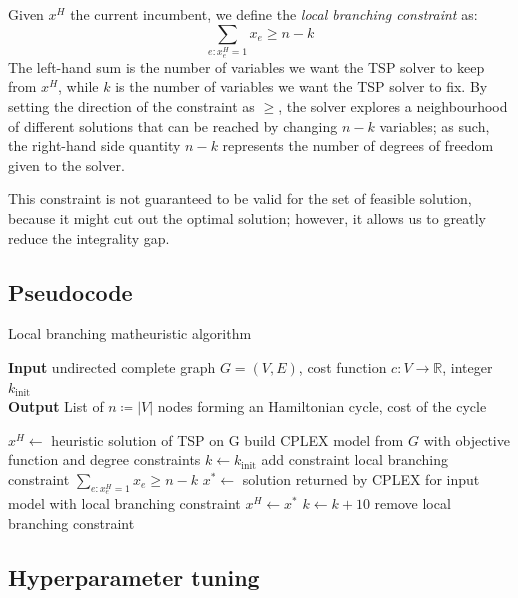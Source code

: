 Given $x^H$ the current incumbent, we define the \textit{local branching constraint} as:
$$\sum_{e:x^H_e=1}x_e\geq n-k$$
The left-hand sum is the number of variables we want the TSP solver to keep from $x^H$, while $k$ is the number of variables we want the TSP solver to fix. By setting the direction of the constraint as $\geq$, the solver explores a neighbourhood of different solutions that can be reached by changing $n-k$ variables; as such, the right-hand side quantity $n-k$ represents the number of degrees of freedom given to the solver.

This constraint is not guaranteed to be valid for the set of feasible solution, because it might cut out the optimal solution; however, it allows us to greatly reduce the integrality gap.
\newpage
\FloatBarrier
\subsection{Pseudocode}
\begin{algorithm}[h]
    \caption{Local branching matheuristic algorithm}
    \hspace*{\algorithmicindent} \textbf{Input} undirected complete graph $G=(V,E)$, cost function $c:V\rightarrow\mathbb{R}$, integer $k_{\text{init}}$\\
    \hspace*{\algorithmicindent} \textbf{Output} List of $n\coloneq|V|$ nodes forming an Hamiltonian cycle, cost of the cycle\\
    \begin{algorithmic}

        \State $x^H \gets$ heuristic solution of TSP on G
        \State build CPLEX model from $G$ with objective function and degree constraints
        \State $k\gets k_{\text{init}}$
        \State add constraint local branching constraint $\sum_{e:x_e^H=1}x_e\geq n-k$
        \State $x^*\gets$ solution returned by CPLEX for input model with local branching constraint
        \State $x^H\gets x^*$
        \EndIf
        \State $k\gets k+10$
        \EndIf
        \State remove local branching constraint
        \EndWhile

    \end{algorithmic}
\end{algorithm}
\FloatBarrier

\subsection{Hyperparameter tuning}

